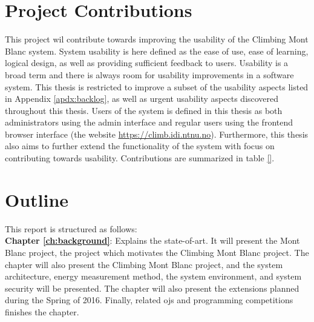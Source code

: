 \section{Project Contributions}
\label{sec:cont}
This project wil contribute towards improving the usability of the Climbing Mont Blanc system. System usability is here defined as the ease of use, ease of learning, logical design, as well as providing sufficient feedback to users. Usability is a broad term and there is always room for usability improvements in a software system. This thesis is restricted to improve a subset of the usability aspects listed in Appendix \ref{apdx:backlog}, as well as urgent usability aspects discovered throughout this thesis. Users of the system is defined in this thesis as both administrators using the admin interface and regular users using the frontend browser interface (the website \url{https://climb.idi.ntnu.no}). Furthermore, this thesis also aims to further extend the functionality of the system with focus on contributing towards usability. Contributions are summarized in table \ref{}.



\section{Outline}
\label{sec:out}
This report is structured as follows:\\

\noindent
\textbf{Chapter \ref{ch:background}}: Explains the state-of-art. It will present the Mont Blanc project, the project which motivates the Climbing Mont Blanc project. The chapter will also present the Climbing Mont Blanc project, and the system architecture, energy measurement method, the system environment, and system security will be presented. The chapter will also present the extensions planned during the Spring of 2016. Finally, related \gls{ojs} and programming competitions finishes the chapter. \\
